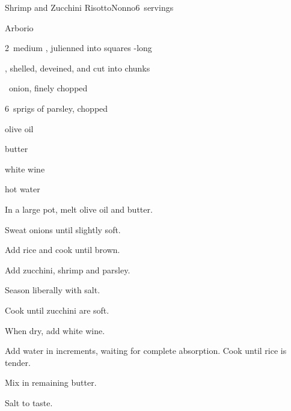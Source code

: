 \begin{recipe}{Shrimp and Zucchini Risotto}{Nonno}{6~servings}

\begin{ingredients}
\item {} Arborio 
\item 2~medium , julienned into \inch{\quarter} squares -long
\item {} , shelled, deveined, and cut into chunks
\item \half{}~onion, finely chopped
\item 6~sprigs of parsley, chopped
\item {} olive oil
\item {} butter
\item \C{\half} white wine
\item hot water
\end{ingredients}

\begin{directions}
\item In a large pot, melt olive oil and butter.
\item Sweat onions until slightly soft.
\item Add rice and cook until brown.
\item Add zucchini, shrimp and parsley.
\item Season liberally with salt.
\item Cook until zucchini are soft.
\item When dry, add white wine.
\item Add water in \C{\half} increments, waiting for complete absorption. Cook until rice is tender.
\item Mix in remaining butter.
\item Salt to taste.
\end{directions}

\end{recipe}
